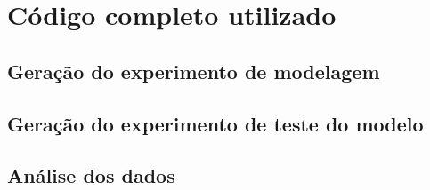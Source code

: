 \chapter{Código completo utilizado}
\label{chap:app_codigo_completo_utilizado}

\section{Geração do experimento de modelagem}
\label{sec:app_codigo_geracao_do_experimento_de_modelagem}




\section{Geração do experimento de teste do modelo}
\label{sec:app_codigo_geracao_do_experimento_de_teste_do_modelo}




\section{Análise dos dados}
\label{sec:app_codigo_analise_dos_dados}

